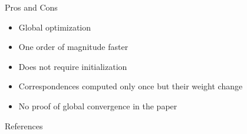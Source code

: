 \documentclass[aspectratio=1610]{beamer}
\newcommand*\pro{%
  \item[\color{ProGreen}\scalebox{1.5}{\faThumbsOUp}]}
\newcommand*\con{%
  \item[\color{ConRed}\scalebox{1.5}{\faThumbsODown}]}
\begin{document}
\begin{frame}{Pros and Cons}
\begin{itemize}[wide, labelsep=2em]
\setlength\itemsep{1em}
\pro Global optimization
\pro One order of magnitude faster
\pro Does not require initialization
\pro Correspondences computed only once but their weight change
\con No proof of global convergence in the paper
\end{itemize}
\end{frame}


\begin{frame}[allowframebreaks]{References}
\printbibliography
\end{frame}
\end{document}

